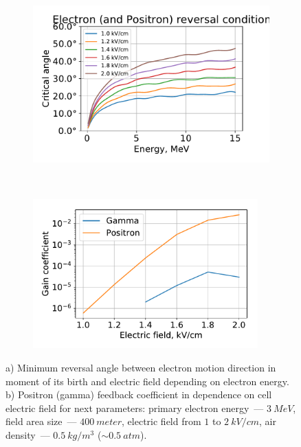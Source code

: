 \documentclass[utf8]{webofc}
\begin{document}
    \begin{figure}[ht!]
        \begin{subfigure}[b]{0.5\textwidth}
            \includegraphics[width=0.95\linewidth]{pictures/09_condition}
            \caption{}
            \label{pic-reverse-b}
        \end{subfigure}
        ~
        \begin{subfigure}[b]{0.5\textwidth}
            \includegraphics[width=0.95\textwidth]{pictures/08_gain}
            
            \caption{}
            \label{pic-gain-a}
        \end{subfigure}
        \caption{ a) Minimum reversal angle between electron motion direction in moment of its birth and electric field depending on electron energy.
            b) Positron (gamma) feedback coefficient in dependence on cell electric field for next parameters: primary electron energy~--- $3~MeV$, field area size~--- $400~meter$, electric field from $1$ to $2~kV/cm$, air density~--- $0.5~kg/m^3$ ($\sim 0.5~atm$).
        }
    \end{figure}
    
\end{document}
